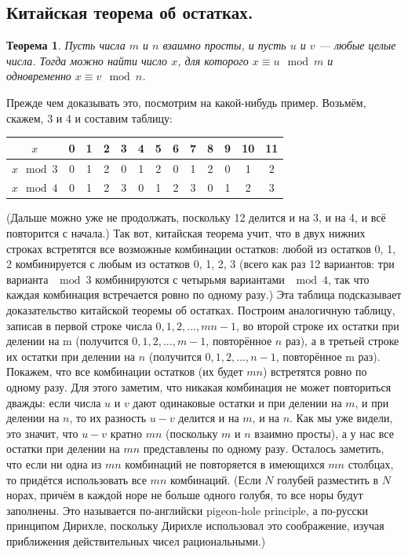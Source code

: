 \documentclass{article}
\newtheorem{theorem}{Теорема}
\begin{document}
\subsection{Китайская теорема об остатках.}
\begin{theorem}
Пусть числа $m$ и $n$ взаимно просты, и пусть $u$ и $v$ — любые целые числа. Тогда можно найти число $x$, для которого $x \equiv u \mod{m}$ и одновременно $x \equiv v \mod{n}$.
\end{theorem}
Прежде чем доказывать это, посмотрим на какой-нибудь пример. Возьмём, скажем, 3 и 4 и составим таблицу:
\begin{center}
    \begin{tabular}{|c|c|c|c|c|c|c|c|c|c|c|c|c|}
        \hline
         $x$ & 0 & 1 & 2 & 3 & 4 & 5 & 6 & 7 & 8 & 9 & 10 & 11 \\
         \hline
         $x \mod{3}$ & 0 & 1 & 2 & 0 & 1 & 2 & 0 & 1 & 2 & 0 & 1 & 2 \\
         \hline
         $x \mod{4}$ & 0 & 1 & 2 & 3 & 0 & 1 & 2 & 3 & 0 & 1 & 2 & 3 \\
         \hline
    \end{tabular}
\end{center}
(Дальше можно уже не продолжать, поскольку 12 делится и на 3, и на 4, и всё повторится с начала.)
\newline
Так вот, китайская теорема учит, что в двух нижних строках встретятся все возможные комбинации остатков: любой из остатков 0, 1, 2 комбинируется с любым из остатков 0, 1, 2, 3 (всего как раз 12 вариантов: три варианта $\mod{3}$ комбинируются с четырьмя вариантами $\mod{4}$, так что каждая комбинация встречается ровно по одному разу.)
\newline
Эта таблица подсказывает доказательство китайской теоремы об остатках. Построим аналогичную таблицу, записав в первой строке числа $0, 1, 2, . . . , mn - 1$, во второй строке их остатки при делении на m (получится $0, 1, 2, . . . , m-1$, повторённое $n$ раз), а в третьей строке их остатки при делении на $n$ (получится $0,1,2,...,n-1$, повторённое m раз). Покажем, что все комбинации остатков (их будет $mn$) встретятся ровно по одному разу. Для этого заметим, что никакая комбинация не может повториться дважды: если числа $u$ и $v$ дают одинаковые остатки и при делении на $m$, и при делении на $n$, то их разность $u - v$ делится и на $m$, и на $n$. Как мы уже видели, это значит, что $u - v$ кратно $mn$ (поскольку $m$ и $n$ взаимно просты), а у нас все остатки при делении на $mn$ представлены по одному разу.
\newline
Осталось заметить, что если ни одна из $mn$ комбинаций не повторяется в имеющихся $mn$ столбцах, то придётся использовать все $mn$ комбинаций. (Если $N$ голубей разместить в $N$ норах, причём в каждой норе не больше одного голубя, то все норы будут заполнены. Это называется по-английски pigeon-hole principle, а по-русски принципом Дирихле, поскольку Дирихле использовал это соображение, изучая приближения действительных чисел рациональными.)
\end{document}

